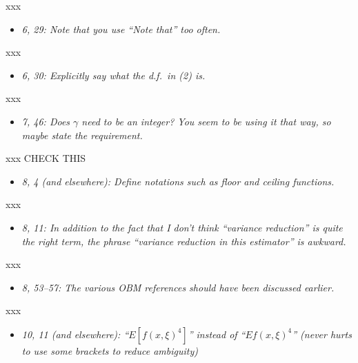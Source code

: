 \documentclass[11pt,notitlepage,onecolumn]{article}
\newcommand{\noi}{\noindent}
\begin{document}
\noi
xxx  
\medskip 



\begin{itemize}
\item[] \textit{6, 29: Note that you use ``Note that'' too often.}
\end{itemize}

\noi
xxx  
\medskip 



\begin{itemize}
\item[] \textit{6, 30: Explicitly say what the d.f.\ in (2) is.}
\end{itemize}

\noi
xxx  
\medskip 



\begin{itemize}
\item[] \textit{7, 46: Does $\gamma$ need to be an integer? 
You seem to be using it that way, so maybe state the requirement.}
\end{itemize}

\noi
xxx  CHECK THIS
\medskip 



\begin{itemize}
\item[] \textit{8, 4 (and elsewhere): Define notations such as floor and ceiling functions.}
\end{itemize}

\noi
xxx  
\medskip 



\begin{itemize}
\item[] \textit{8, 11: In addition to the fact that I don't think ``variance reduction'' is quite the right term, the phrase ``variance reduction in this estimator'' is awkward.}
\end{itemize}

\noi
xxx  
\medskip 



\begin{itemize}
\item[] \textit{8, 53--57: The various OBM references should have been discussed earlier.}
\end{itemize}

\noi
xxx  
\medskip 



\begin{itemize}
\item[] \textit{10, 11 (and elsewhere): ``$E[f(x, \xi)^4]$'' instead of ``$Ef(x, \xi)^4$'' (never hurts to use some brackets to reduce ambiguity)}
\end{itemize}
\end{document}
